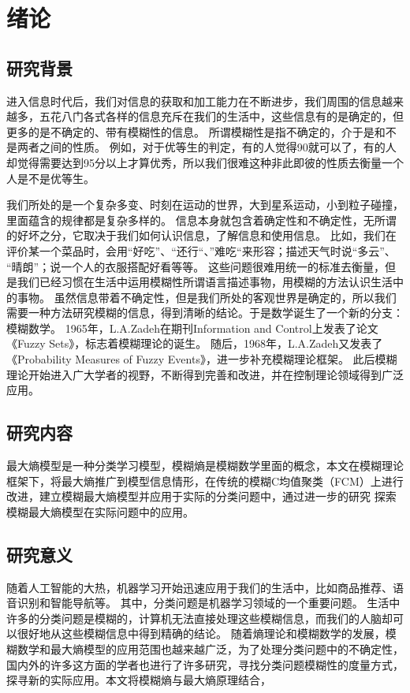 \chapter[绪论]{绪论}
\section{研究背景}
\par
进入信息时代后，我们对信息的获取和加工能力在不断进步，我们周围的信息越来越多，五花八门各式各样的信息充斥在我们的生活中，这些信息有的是确定的，但更多的是不确定的、带有模糊性的信息。
所谓模糊性是指不确定的，介于是和不是两者之间的性质。
例如，对于优等生的判定，有的人觉得90就可以了，有的人却觉得需要达到95分以上才算优秀，所以我们很难这种非此即彼的性质去衡量一个人是不是优等生。
\par
我们所处的是一个复杂多变、时刻在运动的世界，大到星系运动，小到粒子碰撞，里面蕴含的规律都是复杂多样的。
信息本身就包含着确定性和不确定性，无所谓的好坏之分，它取决于我们如何认识信息，了解信息和使用信息。
比如，我们在评价某一个菜品时，会用“好吃”、“还行“、”难吃“来形容；描述天气时说“多云”、 “晴朗”；说一个人的衣服搭配好看等等。
这些问题很难用统一的标准去衡量，但是我们已经习惯在生活中运用模糊性所谓语言描述事物，用模糊的方法认识生活中的事物。
虽然信息带着不确定性，但是我们所处的客观世界是确定的，所以我们需要一种方法研究模糊的信息，得到清晰的结论。于是数学诞生了一个新的分支：模糊数学。
1965年，L.A.Zadeh在期刊Information and Control上发表了论文《Fuzzy Sets》\cite{ZADEH1965fuzzy}，标志着模糊理论的诞生。
随后，1968年，L.A.Zadeh又发表了《Probability Measures of Fuzzy Events》\cite{zadeh1968probability}，进一步补充模糊理论框架。
此后模糊理论开始进入广大学者的视野，不断得到完善和改进，并在控制理论领域得到广泛应用。
\section{研究内容}
最大熵模型是一种分类学习模型，模糊熵是模糊数学里面的概念，本文在模糊理论框架下，将最大熵推广到模型信息情形，在传统的模糊C均值聚类（FCM）上进行改进，建立模糊最大熵模型并应用于实际的分类问题中，通过进一步的研究 探索模糊最大熵模型在实际问题中的应用。
\section{研究意义}
随着人工智能的大热，机器学习开始迅速应用于我们的生活中，比如商品推荐、语音识别和智能导航等。
其中，分类问题是机器学习领域的一个重要问题。
生活中许多的分类问题是模糊的，计算机无法直接处理这些模糊信息，而我们的人脑却可以很好地从这些模糊信息中得到精确的结论。
随着熵理论和模糊数学的发展，模糊数学和最大熵模型的应用范围也越来越广泛，为了处理分类问题中的不确定性，国内外的许多这方面的学者也进行了许多研究，寻找分类问题模糊性的度量方式，探寻新的实际应用。本文将模糊熵与最大熵原理结合，